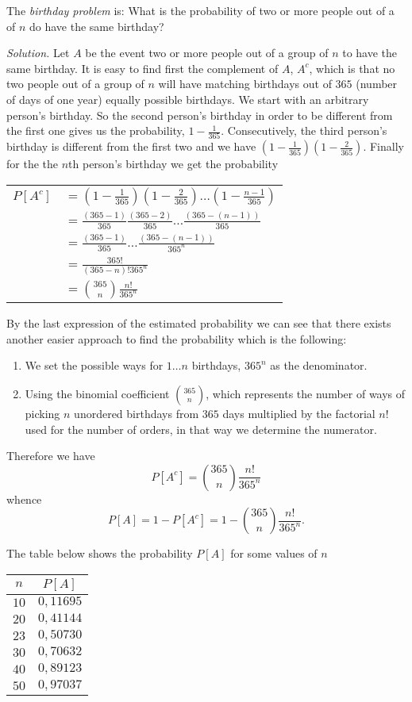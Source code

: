 \documentclass[12pt]{article}
\begin{document}
The \emph{birthday problem} is:
What is the probability of two or more people out of a  of $n$ do have the same birthday?

\textit{Solution.}
Let $A$ be the event two or more people out of a group of $n$ to have the same birthday.
It is easy to find first the complement of $A$, $A^c$, which is that no two people out of a group of $n$ will have matching birthdays out of $365$ (number of days of one year) equally possible birthdays. We start with an arbitrary person's birthday. So the second person's birthday in order to be different from the first one gives us the probability, $1-\frac{1}{365}$.
Consecutively, the third person's birthday is different from the first two and we have $(1-\frac{1}{365})(1-\frac{2}{365})$. Finally for the the $n$th person's birthday we get the probability 
\begin{center}
\begin{tabular}{ll}
$\displaystyle P[A^c]$ & $\displaystyle =\left(1-\frac{1}{365}\right)\left(1-\frac{2}{365}\right)\dots\left(1-\frac{n-1}{365}\right)$\\ & $\displaystyle =\frac{(365-1)}{365}\frac{(365-2)}{365}\dots\frac{(365-(n-1))}{365}$\\ & $\displaystyle =\frac{(365-1)}{365}\dots \frac{(365-(n-1))}{365^n}$\\
& $\displaystyle =\frac{365!}{(365-n)!365^n}$\\ & $\displaystyle ={365\choose n}\frac{n!}{365^n}$
\end{tabular}
\end{center}
By the last expression of the estimated probability we can see that there exists another easier approach to find the probability which is the following:
\begin{enumerate}
\item We set the possible ways for $1\dots n$ birthdays, $365^n$ as the denominator. 
\item Using the binomial coefficient ${365\choose n}$, which represents the number of ways of picking $n$ unordered birthdays from $365$ days multiplied by the factorial $n!$ used for the number of orders, in that way we determine the numerator.
\end{enumerate}
Therefore we have $$P[A^c]={365\choose n}\frac{n!}{365^n}$$
whence
$$P[A]=1-P[A^c]=1-{365\choose n}\frac{n!}{365^n}.$$

The table below shows the probability $P[A]$ for some values of $n$
\begin{center}
\begin{tabular}{|c|c|}
\hline
$n$ & $P[A]$ \\
\hline
$10$ & $0,11695$ \\
\hline
$20$ & $0,41144$ \\
\hline
$23$ & $0,50730$ \\
\hline 
$30$ & $0,70632$ \\
\hline
$40$ & $0,89123$ \\
\hline 
$50$ & $0,97037$ \\
\hline
\end{tabular}
\end{center}



\end{document}
